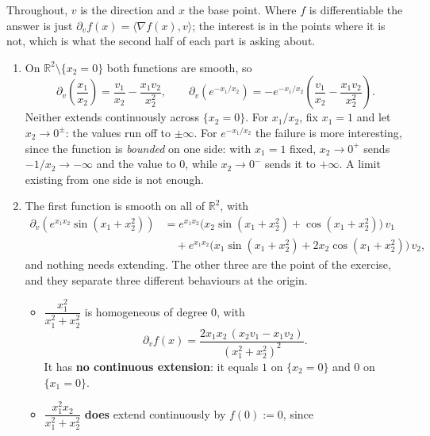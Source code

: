 \begin{exercisesolution}
\label{sol:derivatives_gradient_polar_computation}
Throughout, $v$ is the direction and $x$ the base point. Where $f$ is differentiable the answer is
just $\partial_v f(x) = \langle\nabla f(x), v\rangle$; the interest is in the points where it is
not, which is what the second half of each part is asking about.
\begin{enumerate}[label=\textbf{(\alph*)}]
  \item On $\mathbb{R}^2\setminus\{x_2=0\}$ both functions are smooth, so
    \[\partial_v\!\left(\frac{x_1}{x_2}\right) = \frac{v_1}{x_2} - \frac{x_1v_2}{x_2^2},
      \qquad
      \partial_v\!\left(e^{-x_1/x_2}\right)
        = -e^{-x_1/x_2}\left(\frac{v_1}{x_2} - \frac{x_1v_2}{x_2^2}\right).\]
    Neither extends continuously across $\{x_2 = 0\}$. For $x_1/x_2$, fix $x_1 = 1$ and let
    $x_2 \to 0^{\pm}$: the values run off to $\pm\infty$. For $e^{-x_1/x_2}$ the failure is more
    interesting, since the function is \emph{bounded} on one side: with $x_1 = 1$ fixed,
    $x_2 \to 0^+$ sends $-1/x_2 \to -\infty$ and the value to $0$, while $x_2 \to 0^-$ sends it
    to $+\infty$. A limit existing from one side is not enough.
  \item The first function is smooth on all of $\mathbb{R}^2$, with
    \begin{align*}
      \partial_v\!\left(e^{x_1x_2}\sin(x_1{+}x_2^2)\right)
        &= e^{x_1x_2}\big(x_2\sin(x_1{+}x_2^2) + \cos(x_1{+}x_2^2)\big)\,v_1 \\
        &\quad + e^{x_1x_2}\big(x_1\sin(x_1{+}x_2^2) + 2x_2\cos(x_1{+}x_2^2)\big)\,v_2,
    \end{align*}
    and nothing needs extending. The other three are the point of the exercise, and they separate
    three different behaviours at the origin.
    \begin{itemize}
      \item $\dfrac{x_1^2}{x_1^2+x_2^2}$ is homogeneous of degree $0$, with
        \[\partial_v f(x) = \frac{2x_1x_2\,(x_2v_1 - x_1v_2)}{(x_1^2+x_2^2)^2}.\]
        It has \textbf{no continuous extension}: it equals $1$ on $\{x_2 = 0\}$ and $0$ on
        $\{x_1 = 0\}$.
      \item $\dfrac{x_1^2x_2}{x_1^2+x_2^2}$ \textbf{does} extend continuously by $f(0):=0$, since

\end{itemize}
\end{enumerate}
\end{exercisesolution}
